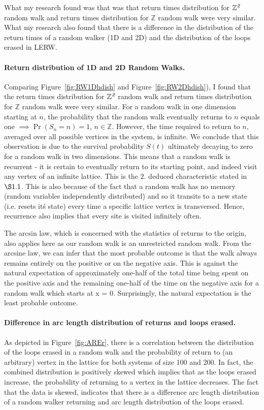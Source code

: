 \documentclass{article}
\begin{document}
What my research found was that was that return times distribution for $\mathbb{Z}^{\emph{2}}$ random walk and return times distribution for $\mathbb{Z}$ random walk were very similar. What my research also found that there is a difference in the distribution of the return times of a random walker (1D and 2D) and the distribution of the loops erased in LERW.

\paragraph{Return distribution of 1D and 2D Random Walks.} Comparing Figure~\ref{fig:RW1Dhdish} and Figure~\ref{fig:RW2Dhdish}), I found that the return times distribution for $\mathbb{Z}^{\emph{2}}$ random walk and return times distribution for $\mathbb{Z}$ random walk were very similar. For a random walk in one dimension starting at $n$, the probability that the random walk eventually returns to $n$ equals one \cite{Redner2002} $\implies \Pr(S_{n}=n) = 1$, $n \in \mathbb{Z}$. However, the time required to return to $n$, averaged over all possible vertices in the system, is infinite.  We conclude that this observation is due to the survival probability $S(t)$ ultimately decaying to zero for a random walk in two dimensions. This means that a random walk is recurrent - it is certain to eventually return to its starting point, and indeed visit any vertex of an infinite lattice. This is the $2.$ deduced characteristic stated in $\S1.1$. This is also because of the fact that a random walk has no memory (random variables independently distributed) and so it transits to a new state (i.e. resets it\' s state) every time a specific lattice vertex is transversed. Hence, recurrence also implies that every site is visited infinitely often.

The arcsin law, which is concerned with the statistics of returns to the origin, also applies here as our random walk is an unrestricted random walk. From the arcsine law, we can infer that the most probable outcome is that the walk always remains entirely on the positive or on the negative axis. This is against the natural expectation of approximately one-half of the total time being spent on the positive axis and the remaining one-half of the time on the negative axis for a random walk which starts at x = 0. Surprisingly, the natural expectation is the least probable outcome.\newline
\paragraph{Difference in arc length distribution of returns and loops erased.} As depicted in Figure~\ref{fig:AREr}, there is a correlation between the distribution of the loops erased in a random walk and the probability of return to (an arbitrary) vertex in the lattice for both systems of size 100 and 200. In fact, the combined distribution is positively skewed which implies that as the loops erased increase, the probability of returning to a vertex in the lattice decreases. The fact that the data is skewed, indicates that there is a difference arc length distribution of a random walker returning and arc length distribution of the loops erased.
\end{document}
